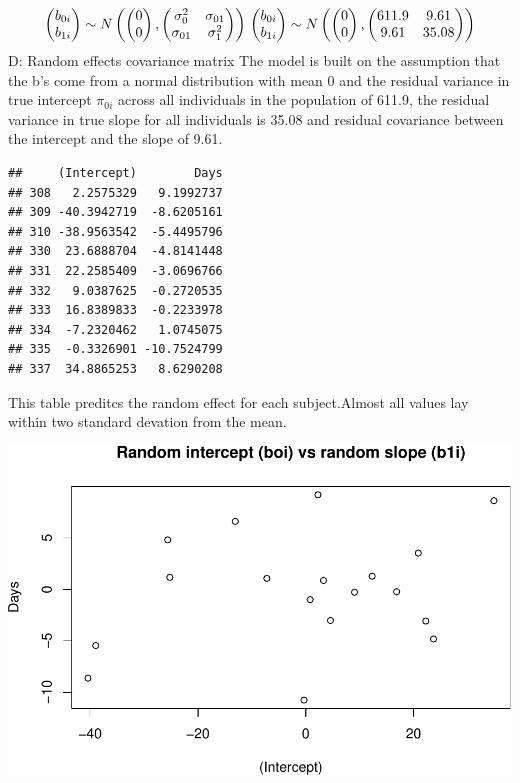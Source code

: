 \documentclass[
]{article}
\begin{document}
\[\begin{pmatrix}
b_{0i} \\
b_{1i}
\end{pmatrix}
\sim
N\begin{pmatrix}
\begin{pmatrix}
0 \\
0
\end{pmatrix},
\begin{pmatrix}
\sigma_{0}^2 & \sigma_{01} \\
\sigma_{01} & \sigma_{1}^2 
\end{pmatrix}
\end{pmatrix}\\
\begin{pmatrix}
b_{0i} \\
b_{1i}
\end{pmatrix}
\sim
N\begin{pmatrix}
\begin{pmatrix}
0 \\
0
\end{pmatrix},
\begin{pmatrix}
611.9 & 9.61 \\
9.61 & 35.08 
\end{pmatrix}
\end{pmatrix}
\] D: Random effects covariance matrix The model is built on the
assumption that the b's come from a normal distribution with mean 0 and
the residual variance in true intercept \(\pi_{0i}\) across all
individuals in the population of 611.9, the residual variance in true
slope for all individuals is 35.08 and residual covariance between the
intercept and the slope of 9.61.

\begin{verbatim}
##     (Intercept)        Days
## 308   2.2575329   9.1992737
## 309 -40.3942719  -8.6205161
## 310 -38.9563542  -5.4495796
## 330  23.6888704  -4.8141448
## 331  22.2585409  -3.0696766
## 332   9.0387625  -0.2720535
## 333  16.8389833  -0.2233978
## 334  -7.2320462   1.0745075
## 335  -0.3326901 -10.7524799
## 337  34.8865253   8.6290208
\end{verbatim}

This table preditcs the random effect for each subject.Almost all values
lay within two standard devation from the mean.

\includegraphics{Common_sleep_files/figure-latex/unnamed-chunk-8-1.pdf}
\end{document}
